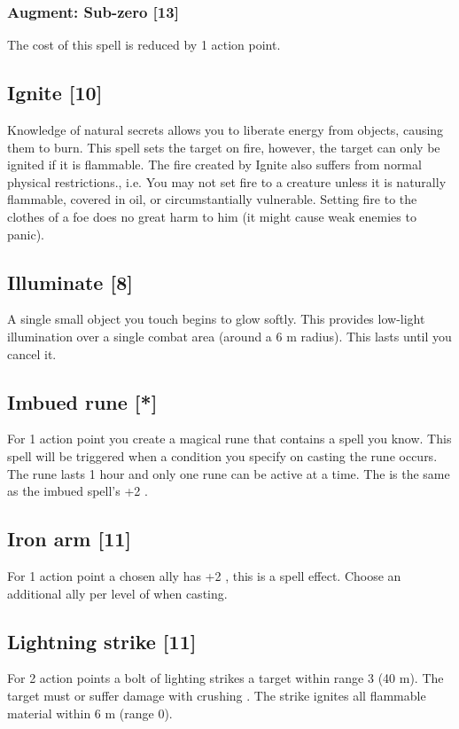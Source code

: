 \subsubsection{Augment: Sub-zero [13]}
The cost of this spell is reduced by 1 action point.

\subsection{Ignite [10]}
\label{spell:ignite}
Knowledge of natural secrets allows you to liberate energy from objects, causing them to burn. This spell sets the target on fire, however, the target can only be ignited if it is flammable. The fire created by Ignite also suffers from normal physical restrictions., i.e. You may not set fire to a creature unless it is naturally flammable, covered in oil, or circumstantially vulnerable. Setting fire to the clothes of a foe does no great harm to him (it might cause weak enemies to panic).

\subsection{Illuminate [8]}
\label{spell:illuminate}
A single small object you touch begins to glow softly. This provides low-light illumination over a single combat area (around a 6 m radius). This lasts until you cancel it.

\subsection{Imbued rune [*]}
For 1 action point you create a magical rune that contains a spell you know. This spell will be triggered when a condition you specify on casting the rune occurs. The rune lasts 1 hour and only one rune can be active at a time. The  is the same as the imbued spell's +2 .

\subsection{Iron arm [11]}
For 1 action point a chosen ally has +2 , this is a  spell effect. Choose an additional ally per level of  when casting.

\subsection{Lightning strike [11]}
For 2 action points a bolt of lighting strikes a target within range 3 (40 m). The target must  or suffer damage with crushing . The strike ignites all flammable material within 6 m (range 0).
